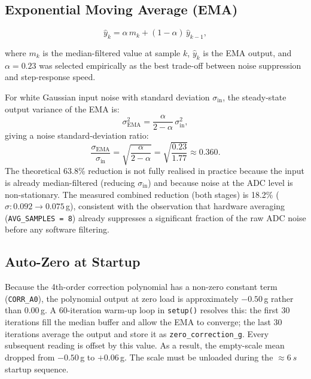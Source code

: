 \documentclass[12pt,a4paper]{article}
\begin{document}
\subsection{Exponential Moving Average (EMA)}

\begin{equation}
  \hat{y}_k = \alpha \, m_k + (1-\alpha)\,\hat{y}_{k-1},
  \label{eq:ema}
\end{equation}

where $m_k$ is the median-filtered value at sample $k$, $\hat{y}_k$ is the EMA output,
and $\alpha = 0.23$ was selected empirically as the best trade-off between noise
suppression and step-response speed.

For white Gaussian input noise with standard deviation $\sigma_\text{in}$, the
steady-state output variance of the EMA is:
\begin{equation}
  \sigma_\text{EMA}^2 = \frac{\alpha}{2-\alpha}\,\sigma_\text{in}^2,
  \label{eq:ema_var}
\end{equation}
giving a noise standard-deviation ratio:
\begin{equation}
  \frac{\sigma_\text{EMA}}{\sigma_\text{in}}
    = \sqrt{\frac{\alpha}{2-\alpha}}
    = \sqrt{\frac{0.23}{1.77}} \approx 0.360.
  \label{eq:ema_snr}
\end{equation}
The theoretical 63.8\% reduction is not fully realised in practice because the input
is already median-filtered (reducing $\sigma_\text{in}$) and because noise at the ADC
level is non-stationary. The measured combined reduction (both stages) is 18.2\%
($\sigma: 0.092 \to 0.075$\,g), consistent with the observation that hardware averaging
(\texttt{AVG\_SAMPLES\,=\,8}) already suppresses a significant fraction of the raw ADC
noise before any software filtering.

\subsection{Auto-Zero at Startup}
\label{sec:autozero}

Because the 4th-order correction polynomial has a non-zero constant term
(\texttt{CORR\_A0}), the polynomial output at zero load is approximately $-0.50$\,g
rather than $0.00$\,g. A 60-iteration warm-up loop in \texttt{setup()} resolves this:
the first 30 iterations fill the median buffer and allow the EMA to converge; the last
30 iterations average the output and store it as \texttt{zero\_correction\_g}. Every
subsequent reading is offset by this value. As a result, the empty-scale mean dropped
from $-0.50$\,g to $+0.06$\,g. The scale must be unloaded during the $\approx\SI{6}{s}$
startup sequence.
\end{document}
